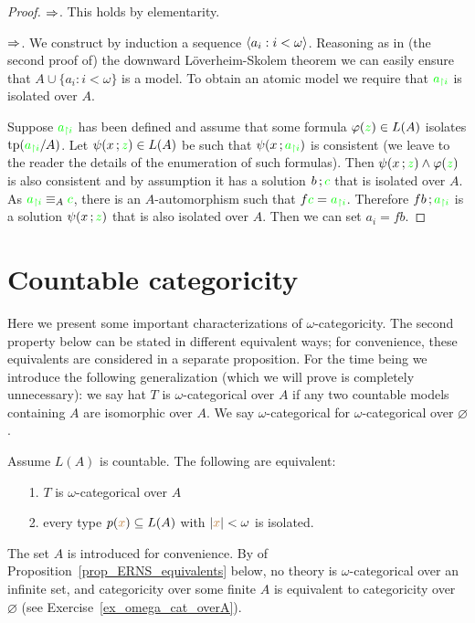 \vspace*{-\parskip}
\begin{proof}
$\Rightarrow$. This holds by elementarity.

$\Rightarrow$. We construct by induction a sequence $\langle{a_i}:i<\omega\rangle$.
Reasoning as in (the second proof of) the downward L\"overheim-Skolem theorem we can easily ensure that $A\cup\big\{{a_i}:i<\omega\big\}$ is a model.
To obtain an atomic model we require that ${\color{green} a_{\restriction i}}$ is isolated over $A$.


Suppose ${\color{green} a_{\restriction i}}$ has been defined and assume that some formula $\varphi({\color{green} z})\in L(A)$ isolates ${\rm tp}({\color{green} a_{\restriction i}}/A)$.
Let $\psi({x}\,;{\color{green} z})\in L(A)$ be such that $\psi({x}\,;{\color{green} a_{\restriction i}})$ is consistent (we leave to the reader the details of the enumeration of such formulas).
Then $\psi({x}\,;{\color{green} z})\wedge\varphi({\color{green} z})$ is also consistent and by assumption it has a solution ${b}\,;{\color{green} c}$ that is isolated over $A$.
As ${\color{green} a_{\restriction i}}\equiv_A{\color{green} c}$, there is an $A$-automorphism such that $f{\color{green} c}={\color{green} a_{\restriction i}}$.
Therefore $f{b}\,;{\color{green} a_{\restriction i}}$ is a solution $\psi({x}\,;{\color{green} z})$ that is also isolated over $A$.
Then we can set ${a_i}=f{b}$.
\end{proof}


\section{Countable categoricity}

Here we present some important characterizations of $\omega$-categoricity.
The second property below can be stated in different equivalent ways; for convenience, these equivalents are considered in a separate proposition.
For the time being we introduce the following generalization (which we will prove is completely unnecessary): we say hat $T$ is $\omega$-categorical over $A$ if any two countable models containing $A$ are isomorphic over $A$.
We say $\omega$-categorical for $\omega$-categorical over $\varnothing$.

\begin{theorem} Assume $L(A)$ is countable.
The following are equivalent:
\begin{itemize}   
\item[1.] $T$ is $\omega$-categorical over $A$
\item[2.] every type $p({\color{brown} x})\subseteq L(A)$ with $|{\color{brown} x}|<\omega$ is isolated.

\end{itemize}
\end{theorem}
The set $A$ is introduced for convenience.
By  of Proposition~\ref{prop_ERNS_equivalents} below, no theory is $\omega$-categorical over an infinite set, and categoricity over some finite $A$ is equivalent to categoricity over $\varnothing$ (see Exercise~\ref{ex_omega_cat_overA}).

